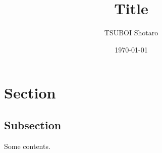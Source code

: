 \documentclass[11pt,a4paper]{ltjsarticle}
\title{Title}
\author{TSUBOI Shotaro}
\date{\today}
\begin{document}
\maketitle

\section{Section}

\subsection{Subsection}

Some contents.
\end{document}
